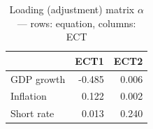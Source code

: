 \begin{table}

\caption{\label{tab:vecm-loadings}Loading (adjustment) matrix $\alpha$ --- rows: equation, columns: ECT}
\centering
\begin{tabular}[t]{lrr}
\toprule
  & ECT1 & ECT2\\
\midrule
GDP growth & -0.485 & 0.006\\
Inflation & 0.122 & 0.002\\
Short rate & 0.013 & 0.240\\
\bottomrule
\end{tabular}
\end{table}

